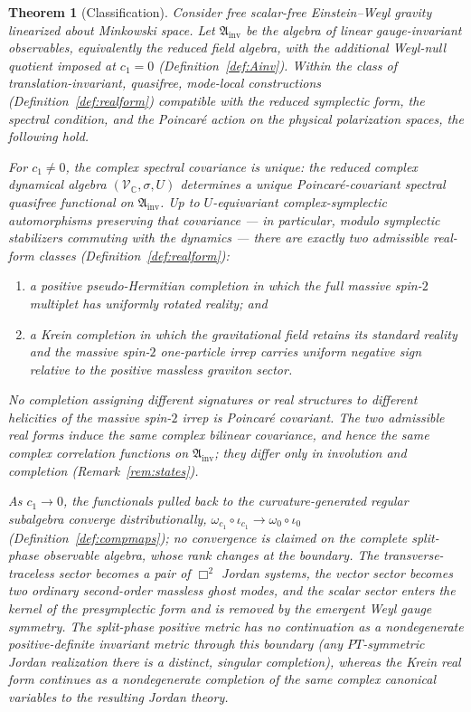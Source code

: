 \documentclass[11pt]{article}
\newtheorem{theorem}{Theorem}[section]
\theoremstyle{definition}
\theoremstyle{remark}
\newcommand{\C}{\mathbb{C}}
\begin{document}
\begin{theorem}[Classification]\label{thm:master}
Consider free scalar-free Einstein--Weyl gravity linearized about
Minkowski space.  Let $\mathfrak A_{\mathrm{inv}}$ be the algebra of
linear gauge-invariant observables, equivalently the reduced field
algebra, with the additional Weyl-null quotient imposed at $c_1=0$
(Definition~\ref{def:Ainv}).  Within the class of translation-invariant,
quasifree, mode-local constructions (Definition~\ref{def:realform})
compatible with the reduced symplectic form, the spectral condition, and
the Poincar\'e action on the physical polarization spaces, the following
hold.

For $c_1\neq0$, the complex spectral covariance is unique: the reduced
complex dynamical algebra $(\mathcal V_\C,\sigma,U)$ determines a unique
Poincar\'e-covariant spectral quasifree functional on
$\mathfrak A_{\mathrm{inv}}$.  Up to $U$-equivariant complex-symplectic
automorphisms preserving that covariance --- in particular, modulo
symplectic stabilizers commuting with the dynamics --- there are exactly
two admissible real-form classes (Definition~\ref{def:realform}):
\begin{enumerate}
\item a positive pseudo-Hermitian completion in which the full massive
spin-$2$ multiplet has uniformly rotated reality; and
\item a Krein completion in which the gravitational field retains its
standard reality and the massive spin-$2$ one-particle irrep carries
uniform negative sign relative to the positive massless graviton sector.
\end{enumerate}
No completion assigning different signatures or real structures to
different helicities of the massive spin-$2$ irrep is Poincar\'e
covariant.  The two admissible real forms induce the same complex
bilinear covariance, and hence the same complex correlation functions on
$\mathfrak A_{\mathrm{inv}}$; they differ only in involution and
completion (Remark~\ref{rem:states}).

As $c_1\to0$, the functionals pulled back to the curvature-generated
regular subalgebra converge distributionally,
$\omega_{c_1}\circ\iota_{c_1}\to\omega_0\circ\iota_0$
(Definition~\ref{def:compmaps}); no convergence is claimed on the
complete split-phase observable algebra, whose rank changes at the
boundary.  The transverse-traceless sector becomes a pair of $\Box^2$
Jordan systems, the vector sector becomes two ordinary second-order
massless ghost modes, and the scalar sector enters the kernel of the
presymplectic form and is removed by the emergent Weyl gauge symmetry.
The split-phase positive metric has no continuation as a nondegenerate
positive-definite invariant metric through this boundary (any
$PT$-symmetric Jordan realization there is a distinct, singular
completion), whereas the Krein real form continues as a nondegenerate
completion of the same complex canonical variables to the resulting
Jordan theory.
\end{theorem}
\end{document}
